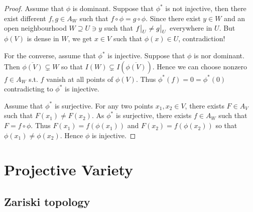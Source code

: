 \documentclass{ctexart}
\begin{document}
\begin{proof}
    Assume that $\phi$ is dominant.
    Suppose that $\phi^{\ast}$ is not injective, then there exist different $f,g\in A_{W}$ such that $f \circ \phi = g \circ \phi$.
    Since there exist $y\in W$ and an open neighbourhood $W \supseteq U\ni y$ such that $f\big{|}_{U} \neq g\big{|}_{U}$ everywhere in $U$.
    But $\phi(V)$ is dense in $W$, we get $x\in V$ such that $\phi(x)\in U$, contradiction!
    \par
    For the converse, assume that $\phi^{\ast}$ is injective.
    Suppose that $\phi$ is nor dominant.
    Then $\overline{\phi(V)} \subsetneq W$ so that $I(W) \subsetneq I(\overline{\phi(V)})$.
    Hence we can choose nonzero $f\in A_{W}$ s.t. $f$ vanish at all points of $\phi(V)$.
    Thus $\phi^{\ast}(f) = 0 = \phi^{\ast}(0)$ contradicting to $\phi^{\ast}$ is injective.
    \par
    Assume that $\phi^{\ast}$ is surjective.
    For any two points $x_{1}, x_{2}\in V$, there exists $F\in A_{V}$ such that $F(x_{1}) \neq F(x_{2})$.
    As $\phi^{\ast}$ is surjective, there exists $f\in A_{W}$ such that $F = f \circ \phi$.
    Thus $F(x_{1}) = f(\phi(x_{1}))$ and $F(x_{2}) = f(\phi(x_{2}))$ so that $\phi(x_{1}) \neq \phi(x_{2})$.
    Hence $\phi$ is injective.
\end{proof}

\section{Projective Variety}
\label{section:Projective_Variety}

\subsection{Zariski topology}
\label{subsection:Projective_Variety_Zariski_topology}
\end{document}
